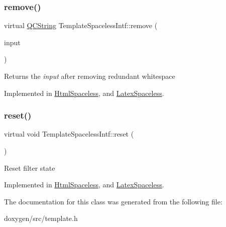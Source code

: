 \subsubsection{\texorpdfstring{remove()}{remove()}}
{\footnotesize\ttfamily virtual \mbox{\hyperlink{class_q_c_string}{Q\+C\+String}} Template\+Spaceless\+Intf\+::remove (\begin{DoxyParamCaption}\item[{const \mbox{\hyperlink{class_q_c_string}{Q\+C\+String}} \&}]{input }\end{DoxyParamCaption})\hspace{0.3cm}{\ttfamily [pure virtual]}}

Returns the {\itshape input} after removing redundant whitespace 

Implemented in \mbox{\hyperlink{class_html_spaceless_ae0979dacb44f1a2db65f14f5bba84a7f}{Html\+Spaceless}}, and \mbox{\hyperlink{class_latex_spaceless_ac7d1401f8710dadab196b83be492b6ed}{Latex\+Spaceless}}.

\mbox{\label{class_template_spaceless_intf_ae6f581a16baa634124ab2e798cc4064c}} 
\subsubsection{\texorpdfstring{reset()}{reset()}}
{\footnotesize\ttfamily virtual void Template\+Spaceless\+Intf\+::reset (\begin{DoxyParamCaption}{ }\end{DoxyParamCaption})\hspace{0.3cm}{\ttfamily [pure virtual]}}

Reset filter state 

Implemented in \mbox{\hyperlink{class_html_spaceless_af7774a1e0cda214f1d50e05dfb52be0b}{Html\+Spaceless}}, and \mbox{\hyperlink{class_latex_spaceless_a75d5def745f89afcbf59a948de20c0db}{Latex\+Spaceless}}.



The documentation for this class was generated from the following file\+:\begin{DoxyCompactItemize}
\item 
doxygen/src/template.\+h\end{DoxyCompactItemize}
